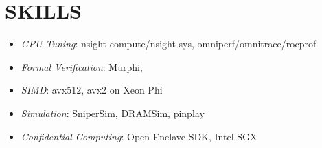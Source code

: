\section{SKILLS}
    \vspace{-7pt}
    \resumeItemListStart
            \begin{itemize}
            \item[] \textit{GPU Tuning}: nsight-compute/nsight-sys, omniperf/omnitrace/rocprof
            \item[] \textit{Formal Verification}: Murphi, 
            \item[] \textit{SIMD}: avx512, avx2 on Xeon Phi
            \item[] \textit{Simulation}: SniperSim, DRAMSim, pinplay
            \item[] \textit{Confidential Computing}: Open Enclave SDK, Intel SGX
            \end{itemize}

    \resumeItemListEnd